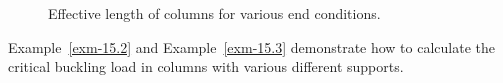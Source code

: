 \documentclass[
  letterpaper,
  DIV=11,
  numbers=noendperiod]{scrreprt}
\theoremstyle{definition}
\theoremstyle{remark}
\begin{document}
\begin{figure}


\caption{\label{fig-15.9}Effective length of columns for various end
conditions.}

\end{figure}%

Example~\ref{exm-15.2} and Example~\ref{exm-15.3} demonstrate how to
calculate the critical buckling load in columns with various different
supports.
\end{document}

